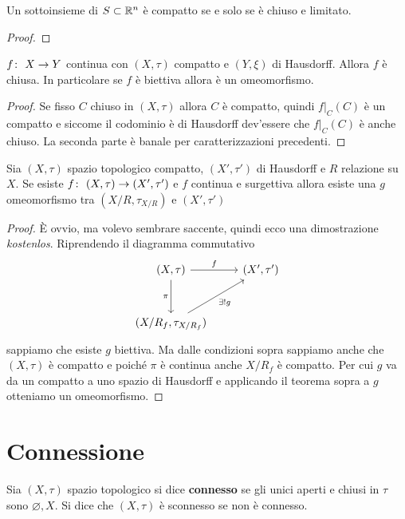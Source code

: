 \begin{corollary}
	Un sottoinsieme di $S \subset \mathbb{R}^n$ è compatto se e solo se è chiuso e limitato. 
\end{corollary} 
\begin{proof}
\end{proof}

\begin{theorem}
	$f \colon\ X \rightarrow Y$ continua con $(X, \tau)$ compatto e $(Y, \xi)$ di Hausdorff. Allora $f$ è chiusa. In particolare se $f$ è biettiva allora è un omeomorfismo. 
\end{theorem} 
\begin{proof}
	Se fisso $C$ chiuso in $(X,\tau)$ allora $C$ è compatto, quindi $f|_C(C)$ è un compatto e siccome il codominio è di Hausdorff dev'essere che $f|_C(C)$ è anche chiuso. La seconda parte è banale per caratterizzazioni precedenti.
\end{proof}

\begin{corollary}
	\label{thr:freeomeombyquo}
	Sia $(X, \tau)$ spazio topologico compatto, $(X', \tau')$ di Hausdorff e $R$ relazione su $X$. Se esiste $f \colon\ (X, \tau) \rightarrow (X', \tau')$ e $f$ continua e surgettiva allora esiste una $g$ omeomorfismo tra $(X/R,\tau_{X/R})$ e $(X', \tau')$
\end{corollary}
\begin{proof}
	È ovvio, ma volevo sembrare saccente, quindi ecco una dimostrazione \textit{kostenlos}.
	Riprendendo il diagramma commutativo 
	\begin{equation*}
		\begin{tikzcd}[row sep = 3em]
			(X, \tau) \arrow[swap]{d}{\pi} \arrow{r}{f} & (X', \tau') \\
			(X/R_f, \tau_{X/R_f}) \arrow[swap]{ru}{\exists! g} &
		\end{tikzcd}	
	\end{equation*}
	sappiamo che esiste $g$ biettiva. Ma dalle condizioni sopra sappiamo anche che $(X,\tau)$ è compatto e poiché $\pi$ è continua anche $X/R_f$ è compatto. Per cui $g$ va da un compatto a uno spazio di Hausdorff e applicando il teorema sopra a $g$ otteniamo un omeomorfismo. 
\end{proof}


\section{Connessione}

\begin{definition}
	Sia $(X, \tau)$ spazio topologico si dice \textbf{connesso} se gli unici aperti e chiusi in $\tau$ sono $\varnothing, X$. Si dice che $(X, \tau)$ è sconnesso se non è connesso. 
\end{definition} 

